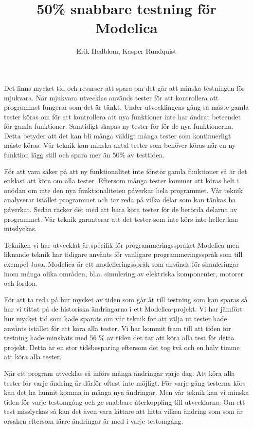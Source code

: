\documentclass{popsci}
\author{Erik Hedblom, Kasper Rundquist}
\title{50\% snabbare testning för Modelica}
\begin{document}


{\noindent Det finns mycket tid och resurser att spara om det går att minska testningen för mjukvara. När mjukvara utvecklas används tester för att kontrollera att programmet fungerar som det är tänkt. Under utvecklingens gång så måste gamla tester köras om för att kontrollera att nya funktioner inte har ändrat beteendet för gamla funktioner. Samtidigt skapas ny tester för för de nya funktionerna. Detta betyder att det kan bli många väldigt många tester som kontinuerligt måste köras. Vår teknik kan minska antal tester som behöver köras när en ny funktion lägg still och spara mer än 50\% av testtiden. 

För att vara säker på att ny funktionalitet inte förstör gamla funktioner så är det enklast att köra om alla tester. %
Eftersom många tester kommer att köras helt i onödan om inte den nya funktionaliteten påverkar hela programmet. Vår teknik analyserar istället programmet och tar reda på vilka delar som kan tänkas ha påverkat. Sedan räcker det med att bara köra tester för de berörda delarna av programmet. Vår teknik garanterar att det tester som inte körs inte heller kan misslyckas.

Tekniken vi har utvecklat är specifik för programmeringsspråket Modelica men liknande teknik har tidigare använts för vanligare programmeringsspråk som till exempel Java. Modelica är ett modelleringsspråk som används för simuleringar inom många olika områden, bl.a. simulering av elektriska komponenter, motorer och fordon. 

För att ta reda på hur mycket av tiden som går åt till testning som kan sparas så har vi tittat på de historiska ändringarna i ett Modelica-projekt. Vi har jämfört hur mycket tid som hade sparats om vår teknik för att välja ut tester hade använts istället för att köra alla tester. Vi har kommit fram till att tiden för testning hade minskats med 56 \% av tiden det tar att köra alla test för detta projekt. Detta är en stor tidsbesparing eftersom det tog två och en halv timme att köra alla tester.

När ett program utvecklas så införs många ändringar varje dag. Att köra alla tester för varje ändring är därför oftast inte möjligt. För varje gång testerna körs kan det ha hunnit komma in många nya ändringar. Men vår teknik kan vi minska tiden för varje testomgång och ge snabbare återkoppling till utvecklarna. Om ett test misslyckas så kan det även vara lättare att hitta vilken ändring som som är orsaken eftersom färre ändringar är med i varje testomgång. 


}
\end{document}
